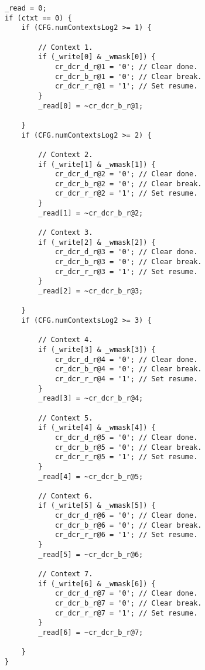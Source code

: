 \implementation{}
\begin{lstlisting}
_read = 0;
if (ctxt == 0) {
    if (CFG.numContextsLog2 >= 1) {
        
        // Context 1.
        if (_write[0] & _wmask[0]) {
            cr_dcr_d_r@1 = '0'; // Clear done.
            cr_dcr_b_r@1 = '0'; // Clear break.
            cr_dcr_r_r@1 = '1'; // Set resume.
        }
        _read[0] = ~cr_dcr_b_r@1;
        
    }
    if (CFG.numContextsLog2 >= 2) {
        
        // Context 2.
        if (_write[1] & _wmask[1]) {
            cr_dcr_d_r@2 = '0'; // Clear done.
            cr_dcr_b_r@2 = '0'; // Clear break.
            cr_dcr_r_r@2 = '1'; // Set resume.
        }
        _read[1] = ~cr_dcr_b_r@2;
        
        // Context 3.
        if (_write[2] & _wmask[2]) {
            cr_dcr_d_r@3 = '0'; // Clear done.
            cr_dcr_b_r@3 = '0'; // Clear break.
            cr_dcr_r_r@3 = '1'; // Set resume.
        }
        _read[2] = ~cr_dcr_b_r@3;
        
    }
    if (CFG.numContextsLog2 >= 3) {
        
        // Context 4.
        if (_write[3] & _wmask[3]) {
            cr_dcr_d_r@4 = '0'; // Clear done.
            cr_dcr_b_r@4 = '0'; // Clear break.
            cr_dcr_r_r@4 = '1'; // Set resume.
        }
        _read[3] = ~cr_dcr_b_r@4;
        
        // Context 5.
        if (_write[4] & _wmask[4]) {
            cr_dcr_d_r@5 = '0'; // Clear done.
            cr_dcr_b_r@5 = '0'; // Clear break.
            cr_dcr_r_r@5 = '1'; // Set resume.
        }
        _read[4] = ~cr_dcr_b_r@5;
        
        // Context 6.
        if (_write[5] & _wmask[5]) {
            cr_dcr_d_r@6 = '0'; // Clear done.
            cr_dcr_b_r@6 = '0'; // Clear break.
            cr_dcr_r_r@6 = '1'; // Set resume.
        }
        _read[5] = ~cr_dcr_b_r@6;
        
        // Context 7.
        if (_write[6] & _wmask[6]) {
            cr_dcr_d_r@7 = '0'; // Clear done.
            cr_dcr_b_r@7 = '0'; // Clear break.
            cr_dcr_r_r@7 = '1'; // Set resume.
        }
        _read[6] = ~cr_dcr_b_r@7;
        
    }
}
\end{lstlisting}

